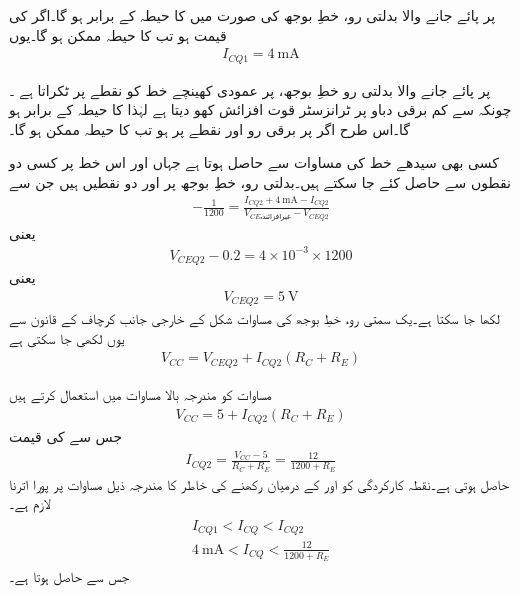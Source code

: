  پر پائے جانے والا بدلتی رو، خطِ بوجھ کی صورت میں  کا حیطہ  کے برابر ہو گا۔اگر  کی قیمت  ہو تب  کا حیطہ  ممکن ہو گا۔یوں
\begin{align}
I_{CQ1}=\SI{4}{\milli \ampere}
\end{align}

 پر پائے جانے والا بدلتی رو خطِ بوجھ،  پر عمودی کھینچے خط کو نقطے پر ٹکراتا ہے ۔چونکہ  سے کم برقی دباو پر ٹرانزسٹر قوت افزائش کھو دیتا ہے لہٰذا  کا حیطہ  کے برابر ہو گا۔اس طرح اگر  پر برقی رو  اور  نقطے پر  ہو تب  کا حیطہ  ممکن ہو گا۔

کسی بھی سیدھے خط کی مساوات  سے  حاصل ہوتا ہے جہاں  اور  اس خط پر کسی دو نقطوں سے حاصل کئے جا سکتے ہیں۔بدلتی رو، خطِ بوجھ پر  اور  دو نقطیں ہیں جن سے 
\begin{align*}
-\frac{1}{1200}=\frac{I_{CQ2}+\SI{4}{\milli \ampere}-I_{CQ2}}{V_{CE\textrm{غیرافزائندہ}}-V_{CEQ2}}
\end{align*}
یعنی
\begin{align*}
V_{CEQ2}-0.2=4 \times 10^{-3} \times 1200
\end{align*}
یعنی
\begin{align}\label{مساوات_ٹرانزسٹر_بدلتی_رو_بار_خط_مساوات_مثال}
V_{CEQ2}=\SI{5}{\volt}
\end{align}
لکھا جا سکتا ہے۔یک سمتی رو، خطِ بوجھ  کی مساوات شکل  کے خارجی جانب کرچاف کے قانون سے یوں لکھی جا سکتی ہے
\begin{align}
V_{CC}=V_{CEQ2}+I_{CQ2} \left(R_C+R_E \right)
\end{align}

مساوات  کو مندرجہ بالا مساوات میں استعمال کرتے ہیں
\begin{align*}
V_{CC}=5+I_{CQ2} \left(R_C+R_E \right)
\end{align*}
جس سے  کی قیمت
\begin{align}
I_{CQ2}=\frac{V_{CC}-5}{R_C+R_E}=\frac{12}{1200+R_E}
\end{align}
حاصل ہوتی ہے۔نقطہ کارکردگی کو  اور  کے درمیان رکھنے کی خاطر  کا مندرجہ ذیل مساوات پر پورا اترنا لازم ہے۔ 
\begin{gather}
\begin{aligned}\label{مساوات_ٹرانزسٹر_حدود_نکتہ_کارکردگی}
I_{CQ1} < I_{CQ}< I_{CQ2}\\
\SI{4}{\milli \ampere} < I_{CQ}< \frac{12}{1200+R_E}
\end{aligned}
\end{gather}
جس سے   حاصل ہوتا ہے۔


